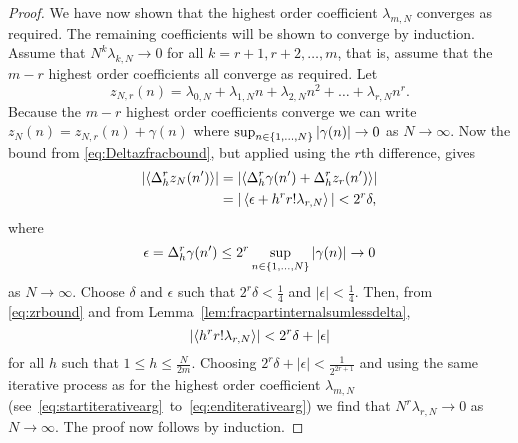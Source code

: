 \documentclass[journal]{IEEEtran}
\begin{document}
\begin{proof}
We have now shown that the highest order coefficient $\lambda_{m,N}$ converges as required. The remaining coefficients will be shown to converge by induction.  Assume that $N^k \lambda_{k,N} \rightarrow 0$ for all $k=r+1, r+2, \dots, m$, that is, assume that the $m-r$ highest order coefficients all converge as required. Let
\[
z_{N,r}(n) = \lambda_{0,N} + \lambda_{1,N} n + \lambda_{2,N} n^2 + \dots + \lambda_{r,N} n^r.
\]
Because the $m-r$ highest order coefficients converge we can write $z_N(n) = z_{N,r}(n) + \gamma(n)$ where $\sup_{n\in\{1,\dots,N\}}\left\vert \gamma(n) \right\vert \rightarrow 0$ as $N\rightarrow\infty$. Now the bound from \eqref{eq:Deltazfracbound}, but applied using the $r$th difference, gives
 \begin{equation}\label{eq:zrbound}
\begin{split}
 \left|\fracpart{  \Delta_h^r z_N(n')}\right| &= \left|\fracpart{  \Delta_h^r\gamma(n') + \Delta_h^r z_r(n') }\right| \\
&= |\fracpart{ \epsilon + h^r r! \lambda_{r,N} }| < 2^r\delta,
\end{split}
 \end{equation}
 where
\[
\epsilon = \Delta_h^r \gamma(n') \leq 2^r \sup_{n\in\{1,\dots,N\}}\left\vert \gamma(n) \right\vert \rightarrow 0
\] 
as $N\rightarrow\infty$.  Choose $\delta$ and $\epsilon$ such that $2^r\delta < \tfrac{1}{4}$ and $|\epsilon| < \tfrac{1}{4}$.  Then, from \eqref{eq:zrbound} and from Lemma~\ref{lem:fracpartinternalsumlessdelta},
\[
\left\vert \left\langle  h^r r! \lambda_{r,N}  \right\rangle \right\vert < 2^r\delta + \left\vert \epsilon \right\vert
\]
for all $h$ such that $1 \leq h \leq \tfrac{N}{2m}$.  Choosing $2^r\delta + |\epsilon| < \frac{1}{2^{2r+1}}$ and using the same iterative process as for the highest order coefficient $\lambda_{m,N}$  (see~\eqref{eq:startiterativearg}~to~\eqref{eq:enditerativearg}) we find that $N^r \lambda_{r,N} \rightarrow 0$ as $N\rightarrow\infty$.  The proof now follows by induction.
 \end{proof}

\end{document}
